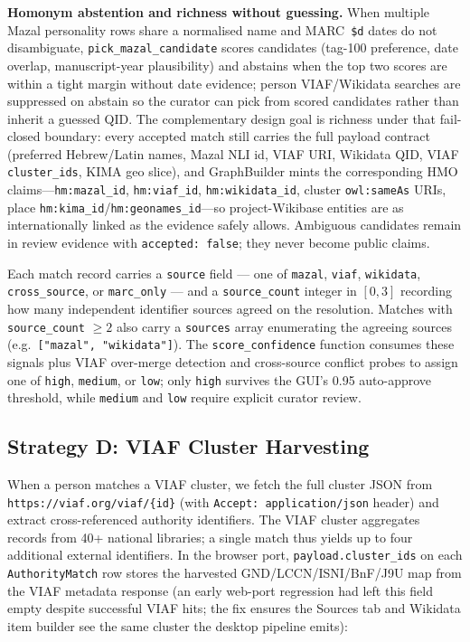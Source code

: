 \documentclass[Afour,sageh,times]{sagej}
\begin{document}
\textbf{Homonym abstention and richness without guessing.} When multiple Mazal personality rows share a normalised name and MARC~\texttt{\$d} dates do not disambiguate, \texttt{pick\_mazal\_candidate} scores candidates (tag-100 preference, date overlap, manuscript-year plausibility) and abstains when the top two scores are within a tight margin without date evidence; person VIAF/Wikidata searches are suppressed on abstain so the curator can pick from scored candidates rather than inherit a guessed QID. The complementary design goal is richness under that fail-closed boundary: every accepted match still carries the full payload contract (preferred Hebrew/Latin names, Mazal NLI id, VIAF URI, Wikidata QID, VIAF \texttt{cluster\_ids}, KIMA geo slice), and GraphBuilder mints the corresponding HMO claims---\texttt{hm:mazal\_id}, \texttt{hm:viaf\_id}, \texttt{hm:wikidata\_id}, cluster \texttt{owl:sameAs} URIs, place \texttt{hm:kima\_id}/\texttt{hm:geonames\_id}---so project-Wikibase entities are as internationally linked as the evidence safely allows. Ambiguous candidates remain in review evidence with \texttt{accepted: false}; they never become public claims.

Each match record carries a \texttt{source} field --- one of \texttt{mazal}, \texttt{viaf}, \texttt{wikidata}, \texttt{cross\_source}, or \texttt{marc\_only} --- and a \texttt{source\_count} integer in $[0, 3]$ recording how many independent identifier sources agreed on the resolution. Matches with \texttt{source\_count} $\geq 2$ also carry a \texttt{sources} array enumerating the agreeing sources (e.g.\ \texttt{["mazal", "wikidata"]}). The \texttt{score\_confidence} function consumes these signals plus VIAF over-merge detection and cross-source conflict probes to assign one of \texttt{high}, \texttt{medium}, or \texttt{low}; only \texttt{high} survives the GUI's 0.95 auto-approve threshold, while \texttt{medium} and \texttt{low} require explicit curator review.

\subsection{Strategy D: VIAF Cluster Harvesting}

When a person matches a VIAF cluster, we fetch the full cluster JSON from \texttt{https://viaf.org/viaf/\{id\}} (with \texttt{Accept: application/json} header) and extract cross-referenced authority identifiers. The VIAF cluster aggregates records from 40+ national libraries; a single match thus yields up to four additional external identifiers. In the browser port, \texttt{payload.cluster\_ids} on each \texttt{AuthorityMatch} row stores the harvested GND/LCCN/ISNI/BnF/J9U map from the VIAF metadata response (an early web-port regression had left this field empty despite successful VIAF hits; the fix ensures the Sources tab and Wikidata item builder see the same cluster the desktop pipeline emits):
\end{document}
